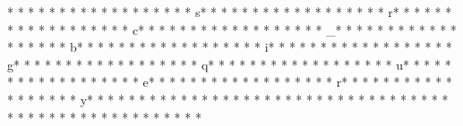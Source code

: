* * *  * * *  * * *  *  * * *  *  * * *  * s* * *  * * *  * * *  *  * * *  *  * * *  * r* * *  * * *  * * *  *  * * *  *  * * *  * c* * *  * * *  * * *  *  * * *  *  * * *  * _* * *  * * *  * * *  *  * * *  *  * * *  * b* * *  * * *  * * *  *  * * *  *  * * *  * i* * *  * * *  * * *  *  * * *  *  * * *  * g* * *  * * *  * * *  *  * * *  *  * * *  * q* * *  * * *  * * *  *  * * *  *  * * *  * u* * *  * * *  * * *  *  * * *  *  * * *  * e* * *  * * *  * * *  *  * * *  *  * * *  * r* * *  * * *  * * *  *  * * *  *  * * *  * y* * *  * * *  * * *  *  * * *  *  * * *  * 
* * *  * * *  * * *  *  * * *  *  * * *  * 
* * *  * * *  * * *  *  * * *  *  * * *  * %